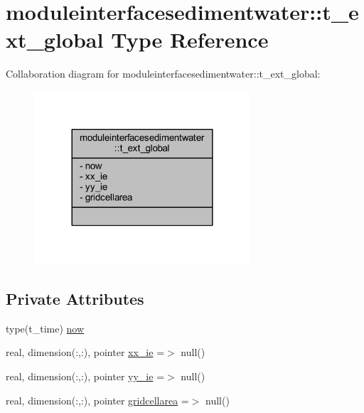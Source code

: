 \hypertarget{structmoduleinterfacesedimentwater_1_1t__ext__global}{}\section{moduleinterfacesedimentwater\+:\+:t\+\_\+ext\+\_\+global Type Reference}
\label{structmoduleinterfacesedimentwater_1_1t__ext__global}


Collaboration diagram for moduleinterfacesedimentwater\+:\+:t\+\_\+ext\+\_\+global\+:\nopagebreak
\begin{figure}[H]
\begin{center}
\leavevmode
\includegraphics[width=228pt]{structmoduleinterfacesedimentwater_1_1t__ext__global__coll__graph}
\end{center}
\end{figure}
\subsection*{Private Attributes}
\begin{DoxyCompactItemize}
\item 
type(t\+\_\+time) \mbox{\hyperlink{structmoduleinterfacesedimentwater_1_1t__ext__global_a98cc0ed5971e7d55e12634fd548ae046}{now}}
\item 
real, dimension(\+:,\+:), pointer \mbox{\hyperlink{structmoduleinterfacesedimentwater_1_1t__ext__global_af96f4d59ee58be3859d1dd61e349b4d8}{xx\+\_\+ie}} =$>$ null()
\item 
real, dimension(\+:,\+:), pointer \mbox{\hyperlink{structmoduleinterfacesedimentwater_1_1t__ext__global_a15d86d5ef5e68403930e29b552bf9cbf}{yy\+\_\+ie}} =$>$ null()
\item 
real, dimension(\+:,\+:), pointer \mbox{\hyperlink{structmoduleinterfacesedimentwater_1_1t__ext__global_a8dedca049ce7f9df4d07732094122bc1}{gridcellarea}} =$>$ null()
\end{DoxyCompactItemize}


